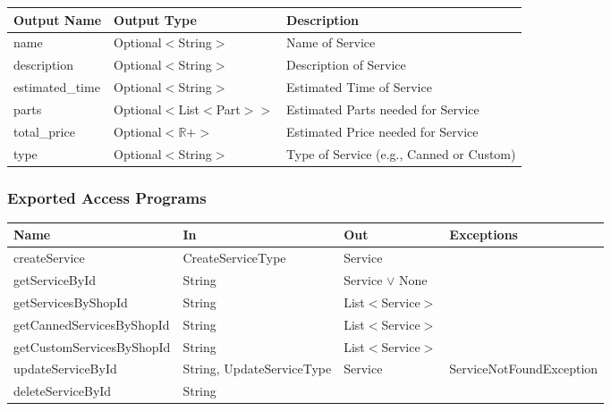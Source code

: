 \documentclass[12pt, titlepage]{article}
\begin{document}
\begin{table}[H]
	\begin{tabular}{|p{}|p{}|p{}|}
		\hline
		\textbf{Output Name} & \textbf{Output Type}       & \textbf{Description}                     \\
		\hline
		name                 & Optional$<$String$>$       & Name of Service                          \\
		\hline
		description          & Optional$<$String$>$       & Description of Service                   \\
		\hline
		estimated\_time      & Optional$<$String$>$       & Estimated Time of Service                \\
		\hline
		parts                & Optional$<$List$<$Part$>>$ & Estimated Parts needed for Service       \\
		\hline
		total\_price         & Optional$<\mathbb{R}+>$    & Estimated Price needed for Service       \\
		\hline
		type                 & Optional$<$String$>$       & Type of Service (e.g., Canned or Custom) \\
		\hline
	\end{tabular}
\end{table}

\subsubsection{Exported Access Programs}

\begin{center}
	\begin{adjustbox}{width=\textwidth}
		\begin{tabular}{llll}
			\hline
			\textbf{Name}             & \textbf{In}               & \textbf{Out}        & \textbf{Exceptions}      \\
			\hline
			createService             & CreateServiceType         & Service             & ~                        \\
			getServiceById            & String                    & Service $\lor$ None & ~                        \\
			getServicesByShopId       & String                    & List$<$Service$>$   & ~                        \\
			getCannedServicesByShopId & String                    & List$<$Service$>$   & ~                        \\
			getCustomServicesByShopId & String                    & List$<$Service$>$   & ~                        \\
			updateServiceById         & String, UpdateServiceType & Service             & ServiceNotFoundException \\
			deleteServiceById         & String                    & ~                   & ~                        \\
			\hline
		\end{tabular}
	\end{adjustbox}
\end{center}
\end{document}
